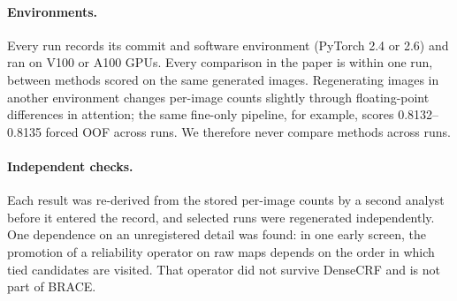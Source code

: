 \documentclass[10pt,twocolumn,letterpaper]{article}
\begin{document}
\paragraph{Environments.}
Every run records its commit and software environment (PyTorch 2.4 or 2.6) and ran on V100 or A100 GPUs. Every comparison in the paper is within one run, \ie between methods scored on the same generated images. Regenerating images in another environment changes per-image counts slightly through floating-point differences in attention; the same fine-only pipeline, for example, scores 0.8132--0.8135 forced OOF across runs. We therefore never compare methods across runs.

\paragraph{Independent checks.}
Each result was re-derived from the stored per-image counts by a second analyst before it entered the record, and selected runs were regenerated independently. One dependence on an unregistered detail was found: in one early screen, the promotion of a reliability operator on raw maps depends on the order in which tied candidates are visited. That operator did not survive DenseCRF and is not part of BRACE.

{
    \small
    
    
}
\end{document}
